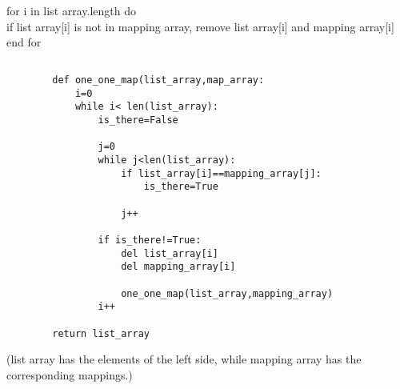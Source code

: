 \documentclass{article}
\begin{document}
		for i in list array.length do\\
			if list array[i] is not in mapping array, remove list array[i] and mapping array[i]\\
		end for\\
			
		
	\subsection{}
		\begin{lstlisting}
		def one_one_map(list_array,map_array:
			i=0
			while i< len(list_array):
				is_there=False
				
				j=0
				while j<len(list_array):
					if list_array[i]==mapping_array[j]:
						is_there=True
						
					j++
				
				if is_there!=True:
					del list_array[i]
					del mapping_array[i]
					
					one_one_map(list_array,mapping_array)
				i++
					
		return list_array
		\end{lstlisting}

		
		(list array has the elements of the left side, while mapping array has the corresponding mappings.)
\end{document}
